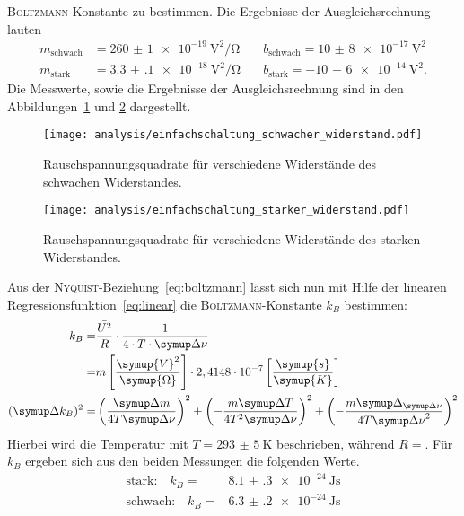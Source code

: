 \textsc{Boltzmann}-Konstante zu bestimmen. Die Ergebnisse der Ausgleichsrechnung
lauten
%
\begin{align*}
  m_\text{schwach}&=\SI{260(1)e-19}{\volt\squared\per\ohm} \quad &b_\text{schwach}=\SI{10(8)e-17}{\volt\squared} \\ m_\text{stark}&=\SI{3.3(1)e-18}{\volt\squared\per\ohm} \quad &b_\text{stark}=\SI{-10(6)e-14}{\volt\squared}.
\end{align*}
%
Die Messwerte, sowie die Ergebnisse der Ausgleichsrechnung sind in den Abbildungen~\ref{fig:r_schwach} und \ref{fig:r_stark} dargestellt.
%
\begin{figure}
  \centering
  \texttt{[image: analysis/einfachschaltung\_schwacher\_widerstand.pdf]}
  \caption{Rauschspannungsquadrate für verschiedene Widerstände des schwachen Widerstandes.}
  \label{fig:r_schwach}
\end{figure}
%
%
\begin{figure}
  \centering
  \texttt{[image: analysis/einfachschaltung\_starker\_widerstand.pdf]}
  \caption{Rauschspannungsquadrate für verschiedene Widerstände des starken Widerstandes.}
  \label{fig:r_stark}
\end{figure}
%

Aus der \textsc{Nyquist}-Beziehung~\eqref{eq:boltzmann} lässt sich nun mit Hilfe der linearen Regressionsfunktion~\ref{eq:linear}
 die \textsc{Boltzmann}-Konstante $k_B$ bestimmen:
%
\begin{align}
  k_B=&\frac{\bar{U^2}}{R}\cdot\frac{1}{4\cdot T\cdot\upD\nu} \\
  \label{eq:k}
     =&m\left[\frac{\symup{V}^2}{\symup{\Omega}}\right]\cdot2,4148\cdot10^{-7}\left[\frac{\symup{s}}{\symup{K}}\right] \\
  (\upD k_B)^2=&\left(\frac{\upD m}{4T\upD\nu}\right)^2+\left(-\frac{m\upD T}{4T^2\upD\nu}\right)^2+\left(-\frac{m\upD_{\upD\nu}}{4T{\upD\nu}^2}\right)^2
\end{align}
%
Hierbei wird die Temperatur mit $T=\SI{293(5)}{\kelvin}$ beschrieben, während $R=$. Für $k_{B}$ ergeben sich aus den beiden Messungen die folgenden Werte.
%
\begin{align}
  \text{stark:}\quad k_{B}=&\SI{8.1(3)e-24}{\joule\second} \\
  \text{schwach:}\quad k_{B}=&\SI{6.3(2)e-24}{\joule\second}
\end{align}
%
